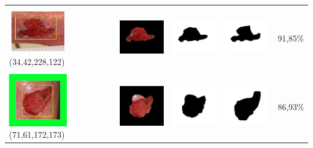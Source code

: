 \begin{table}[H]
\begin{tabular}{|m{1.0in}|m{1.0in}|m{1.0in}|m{1.0in}|m{0.6in}|}
		&  &  & \\
		\includegraphics[width=1.0in]{gambar/hasil_segmentasi/luka_merah/image_23_rect.jpg} {\centering\fontsize{10}{10}\selectfont(34,42,228,122)}&
		\includegraphics[width=1.0in]{gambar/hasil_segmentasi/luka_merah/result_23.jpg}&
		\includegraphics[width=1.0in]{gambar/hasil_segmentasi/luka_merah/mask_r_23.jpg}&
		\includegraphics[width=1.0in]{gambar/hasil_segmentasi/luka_merah/23_r.jpg}&
		91,85\% \\
		\hline

		&  &  & \\
		\includegraphics[width=1.0in]{gambar/hasil_segmentasi/luka_merah/image_26_rect.jpg} {\centering\fontsize{10}{10}\selectfont(71,61,172,173)}&
		\includegraphics[width=1.0in]{gambar/hasil_segmentasi/luka_merah/result_26.jpg}&
		\includegraphics[width=1.0in]{gambar/hasil_segmentasi/luka_merah/mask_r_26.jpg}&
		\includegraphics[width=1.0in]{gambar/hasil_segmentasi/luka_merah/26_r.jpg}&
		86,93\% \\
		\hline


\end{tabular}
\end{table}
